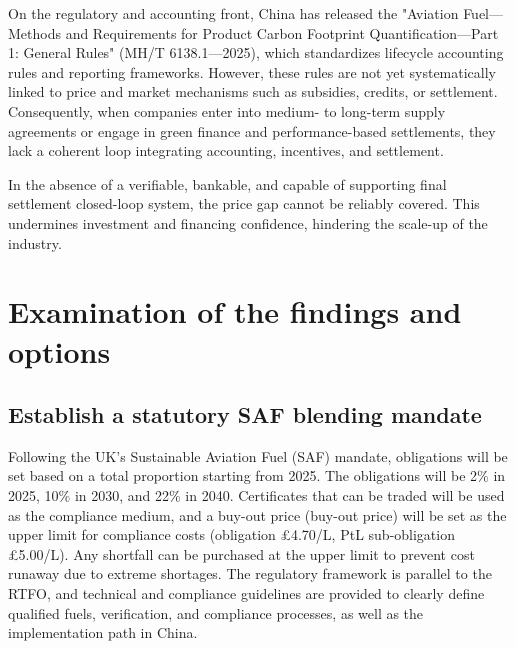 \documentclass[a4paper,11pt]{article}
\begin{document}
On the regulatory and accounting front, China has released the "Aviation Fuel---Methods and Requirements for Product Carbon Footprint Quantification---Part 1: General Rules" (MH/T 6138.1---2025), which standardizes lifecycle accounting rules and reporting frameworks. However, these rules are not yet systematically linked to price and market mechanisms such as subsidies, credits, or settlement. Consequently, when companies enter into medium- to long-term supply agreements or engage in green finance and performance-based settlements, they lack a coherent loop integrating accounting, incentives, and settlement.

In the absence of a verifiable, bankable, and capable of supporting final settlement closed-loop system, the price gap cannot be reliably covered. This undermines investment and financing confidence, hindering the scale-up of the industry.


\section{Examination of the findings and options}

\subsection{Establish a statutory SAF blending mandate}
Following the UK's Sustainable Aviation Fuel (SAF) mandate, obligations will be set based on a total proportion starting from 2025. The obligations will be 2\% in 2025, 10\% in 2030, and 22\% in 2040. Certificates that can be traded will be used as the compliance medium, and a buy-out price (buy-out price) will be set as the upper limit for compliance costs (obligation £4.70/L, PtL sub-obligation £5.00/L). Any shortfall can be purchased at the upper limit to prevent cost runaway due to extreme shortages. The regulatory framework is parallel to the RTFO, and technical and compliance guidelines are provided to clearly define qualified fuels, verification, and compliance processes, as well as the implementation path in China.
\end{document}
